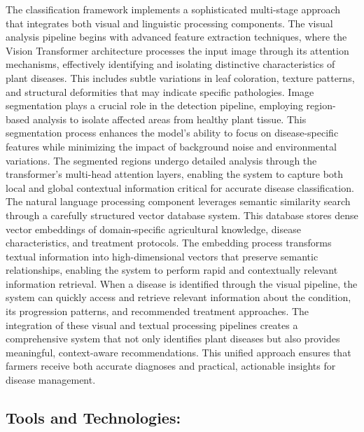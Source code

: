 The classification framework implements a sophisticated multi-stage approach that integrates both visual and linguistic processing components. The visual analysis pipeline begins with advanced feature extraction techniques, where the Vision Transformer architecture processes the input image through its attention mechanisms, effectively identifying and isolating distinctive characteristics of plant diseases. This includes subtle variations in leaf coloration, texture patterns, and structural deformities that may indicate specific pathologies.
Image segmentation plays a crucial role in the detection pipeline, employing region-based analysis to isolate affected areas from healthy plant tissue. This segmentation process enhances the model's ability to focus on disease-specific features while minimizing the impact of background noise and environmental variations. The segmented regions undergo detailed analysis through the transformer's multi-head attention layers, enabling the system to capture both local and global contextual information critical for accurate disease classification.
The natural language processing component leverages semantic similarity search through a carefully structured vector database system. This database stores dense vector embeddings of domain-specific agricultural knowledge, disease characteristics, and treatment protocols. The embedding process transforms textual information into high-dimensional vectors that preserve semantic relationships, enabling the system to perform rapid and contextually relevant information retrieval. When a disease is identified through the visual pipeline, the system can quickly access and retrieve relevant information about the condition, its progression patterns, and recommended treatment approaches.
The integration of these visual and textual processing pipelines creates a comprehensive system that not only identifies plant diseases but also provides meaningful, context-aware recommendations. This unified approach ensures that farmers receive both accurate diagnoses and practical, actionable insights for disease management.

\subsection{Tools and Technologies:} 

